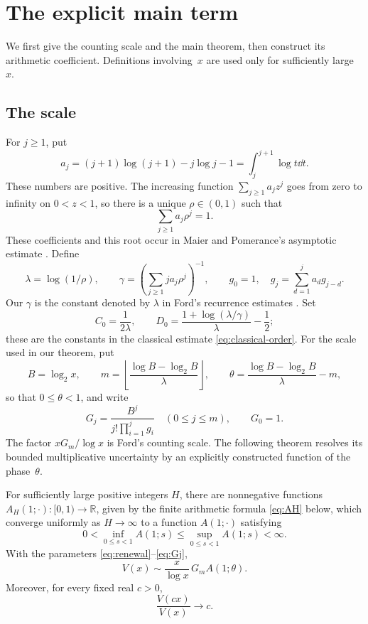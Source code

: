 \section{The explicit main term}\label{sec:statements}
We first give the counting scale and the main theorem, then construct its
arithmetic coefficient. Definitions involving~$x$ are used only for
sufficiently large~$x$.

\subsection{The scale}
For $j\ge1$, put
\begin{equation}\label{eq:aj}
 a_j=(j+1)\log(j+1)-j\log j-1
     =\int_j^{j+1}\log t\dd t.
\end{equation}
These numbers are positive. The increasing function $\sum_{j\ge1}a_jz^j$ goes from zero to infinity on $0<z<1$, so there is a unique $\rho\in(0,1)$ such that
\[
 \sum_{j\ge1}a_j\rho^j=1.
\]
These coefficients and this root occur in Maier and Pomerance's
asymptotic estimate \cite[Section~1]{MaierPomerance1988}.
Define
\begin{equation}\label{eq:renewal}
 \lambda=\log(1/\rho),\qquad
 \gamma=\left(\sum_{j\ge1}ja_j\rho^j\right)^{-1},\qquad
 g_0=1,\quad g_j=\sum_{d=1}^j a_dg_{j-d}.
\end{equation}
Our $\gamma$ is the constant denoted by $\lambda$ in Ford's recurrence estimates \cite[Section~3]{FordTotients2013}. Set
\[
 C_0=\frac1{2\lambda},\qquad
 D_0=\frac{1+\log(\lambda/\gamma)}{\lambda}-\frac12;
\]
these are the constants in the classical estimate
\eqref{eq:classical-order}. For the scale used in our theorem, put
\begin{equation}\label{eq:scales}
 B=\log_2x,\qquad
 m=\left\lfloor\frac{\log B-\log_2B}{\lambda}\right\rfloor,
 \qquad
 \theta=\frac{\log B-\log_2B}{\lambda}-m,
\end{equation}
so that $0\le\theta<1$, and write
\begin{equation}\label{eq:Gj}
 G_j=\frac{B^j}{j!\prod_{i=1}^j g_i}\quad(0\le j\le m),\qquad G_0=1.
\end{equation}
The factor $xG_m/\log x$ is Ford's counting scale. The following theorem
resolves its bounded multiplicative uncertainty by an explicitly constructed
function of the phase~$\theta$.

\begin{theorem}\label{thm:main}
For sufficiently large positive integers $H$, there are nonnegative
functions $A_H(1;\cdot):[0,1)\to\mathbb R$, given by the finite
arithmetic formula \eqref{eq:AH} below,
which converge uniformly as $H\to\infty$ to a function $A(1;\cdot)$
satisfying
\[
 0<\inf_{0\le s<1}A(1;s)
   \le\sup_{0\le s<1}A(1;s)<\infty.
\]
With the parameters \eqref{eq:renewal}--\eqref{eq:Gj},
\[
 V(x)\sim\frac{x}{\log x}\,G_m A(1;\theta).
\]
Moreover, for every fixed real $c>0$,
\[
 \frac{V(cx)}{V(x)}\longrightarrow c.
\]
\end{theorem}

